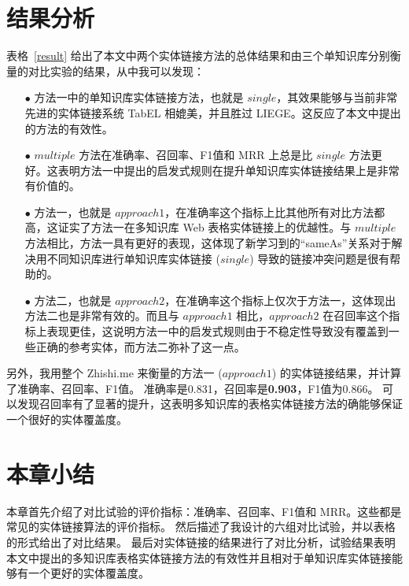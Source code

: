 \section{结果分析}
表格~\ref{result} 给出了本文中两个实体链接方法的总体结果和由三个单知识库分别衡量的对比实验的结果，从中我可以发现：
\begin{itemize}
  \item[$\bullet$] 方法一中的单知识库实体链接方法，也就是 $single$，其效果能够与当前非常先进的实体链接系统 TabEL 相媲美，并且胜过 LIEGE。这反应了本文中提出的方法的有效性。
  \item[$\bullet$] $multiple$ 方法在准确率、召回率、F1值和 MRR 上总是比 $single$ 方法更好。这表明方法一中提出的启发式规则在提升单知识库实体链接结果上是非常有价值的。
  \item[$\bullet$] 方法一，也就是 $approach1$，在准确率这个指标上比其他所有对比方法都高，这证实了方法一在多知识库 Web 表格实体链接上的优越性。与 $multiple$ 方法相比，方法一具有更好的表现，这体现了新学习到的``sameAs''关系对于解决用不同知识库进行单知识库实体链接 ($single$) 导致的链接冲突问题是很有帮助的。
  \item[$\bullet$] 方法二，也就是 $approach2$，在准确率这个指标上仅次于方法一，这体现出方法二也是非常有效的。而且与 $approach1$ 相比，$approach2$ 在召回率这个指标上表现更佳，这说明方法一中的启发式规则由于不稳定性导致没有覆盖到一些正确的参考实体，而方法二弥补了这一点。
\end{itemize}
另外，我用整个 Zhishi.me 来衡量的方法一 ($approach1$) 的实体链接结果，并计算了准确率、召回率、F1值。
准确率是0.831，召回率是\textbf{0.903}，F1值为0.866。
可以发现召回率有了显著的提升，这表明多知识库的表格实体链接方法的确能够保证一个很好的实体覆盖度。


\section{本章小结}
本章首先介绍了对比试验的评价指标：准确率、召回率、F1值和 MRR。这些都是常见的实体链接算法的评价指标。
然后描述了我设计的六组对比试验，并以表格的形式给出了对比结果。
最后对实体链接的结果进行了对比分析，试验结果表明本文中提出的多知识库表格实体链接方法的有效性并且相对于单知识库实体链接能够有一个更好的实体覆盖度。